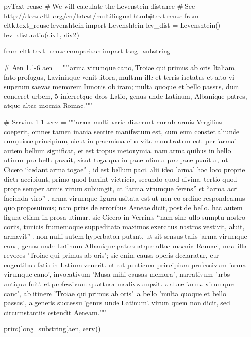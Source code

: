 \documentclass[10pt,a4paper]{article}
\begin{document}
\begin{multicols}{3}
\begin{codebox}{py}{Text reuse}
# We will calculate the Levenstein distance
# See http://docs.cltk.org/en/latest/multilingual.html#text-reuse
from cltk.text_reuse.levenshtein import Levenshtein
lev_dist = Levenshtein()
lev_dist.ratio(div1, div2)

from cltk.text_reuse.comparison import long_substring

# Aen 1.1-6
aen = """arma virumque cano, Troiae qui primus ab oris
Italiam, fato profugus, Laviniaque venit
litora, multum ille et terris iactatus et alto
vi superum saevae memorem Iunonis ob iram;
multa quoque et bello passus, dum conderet urbem,               5
inferretque deos Latio, genus unde Latinum,
Albanique patres, atque altae moenia Romae."""

# Servius 1.1
serv = """arma multi varie disserunt cur ab armis Vergilius coeperit, omnes tamen inania sentire manifestum est, cum eum constet aliunde sumpsisse principium, sicut in praemissa eius vita monstratum est. per 'arma' autem bellum significat, et est tropus metonymia. nam arma quibus in bello utimur pro bello posuit, sicut toga qua in pace utimur pro pace ponitur, ut Cicero “cedant arma togae” , id est bellum paci. alii ideo 'arma' hoc loco proprie dicta accipiunt, primo quod fuerint victricia, secundo quod divina, tertio quod prope semper armis virum subiungit, ut “arma virumque ferens” et “arma acri facienda viro” . arma virumque figura usitata est ut non eo ordine respondeamus quo proposuimus; nam prius de erroribus Aeneae dicit, post de bello. hac autem figura etiam in prosa utimur. sic Cicero in Verrinis “nam sine ullo sumptu nostro coriis, tunicis frumentoque suppeditato maximos exercitus nostros vestivit, aluit, armavit” . non nulli autem hyperbaton putant, ut sit sensus talis 'arma virumque cano, genus unde Latinum Albanique patres atque altae moenia Romae', mox illa revoces 'Troiae qui primus ab oris'; sic enim causa operis declaratur, cur cogentibus fatis in Latium venerit. et est poeticum principium professivum 'arma virumque cano', invocativum 'Musa mihi causas memora', narrativum 'urbs antiqua fuit'. et professivum quattuor modis sumpsit: a duce 'arma virumque cano', ab itinere 'Troiae qui primus ab oris', a bello 'multa quoque et bello passus', a generis successu 'genus unde Latinum'. virum quem non dicit, sed circumstantiis ostendit Aeneam."""

print(long_substring(aen, serv))
\end{codebox}

\AtNextBibliography{\footnotesize}
\printbibliography  
\end{multicols}
\end{document}
